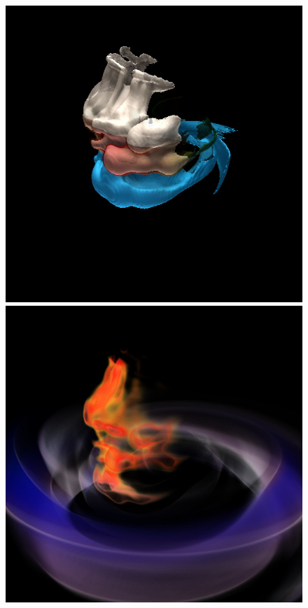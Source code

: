\documentclass{egpubl}
\newlength{\boxheight}
\begin{document}
\begin{figure}[p]
\begin{minipage}[b][\boxheight][b]{0.24\linewidth}
\begin{minipage}[t]{0.98\linewidth}
      \centering
      \includegraphics[width=\textwidth]{snapshots/space/space-only-isos.jpg}
    \end{minipage}%
    \vfill%
    \begin{minipage}[b]{0.98\linewidth}
      \centering
      \includegraphics[width=\textwidth]{snapshots/space/space-only-vols.jpg}

\end{minipage}
\end{minipage}
\end{figure}
\end{document}
